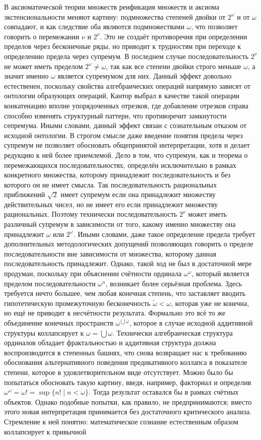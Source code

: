 \documentclass[12pt]{article}
\begin{document}
В аксиоматической теории множеств реификация множеств и аксиома экстенсиональности меняют картину: подмножества степеней двойки от $2^\omega$ и от $\omega$ совпадают, и как следствие оба являются подмножествами $\omega$, что позволяет говорить о перемежании $\nu$ и $2^{\nu}$. Это не создаёт противоречия при определении пределов через бесконечные ряды, но приводит к трудностям при переходе к определению предела через супремум. В последнем случае последовательность $2^\nu$ не может иметь пределом $2^\omega \neq \omega$, так как все степени двойки строго меньше $\omega$, а значит именно $\omega$ является супремумом для них. Данный эффект довольно естественен, поскольку свойства алгебраических операций напрямую зависят от онтологии образующих операций, Кантор выбрал в качестве такой операции конкатенацию вполне упорядоченных отрезков, где добавление отрезков справа способно изменять структурный паттерн, что противоречит замкнутости сепремума. Иными словами, данный эффект связан с сознательным отказом от исходной онтологии. В строгом смысле даже введение понятия предела через супремум не позволяет обосновать общепринятой интерпретации, хотя и делает редукцию к ней более приемлемой. Дело в том, что супремум, как и теорема о перемежающихся последовательностях, определён исключительно в рамках конкретного множества, которому принадлежит последовательность и без которого он не имеет смысла. Так последовательность рациональных приближений $\sqrt{2}$ имеет супремум если она принадлежит множеству действительных чисел, но не имеет его если принадлежит множеству рациональных. Поэтому технически последовательность $2^{\nu}$ может иметь различный супремум в зависимости от того, какому именно множеству она принадлежит $\omega$ или $2^{\omega}$. Иными словами, даже такое определение предела требует дополнительных методологических допущений позволяющих говорить о пределе последовательности вне зависимости от множества, которому данная последовательность принадлежит. Однако, такой ход не был в достаточной мере продуман, поскольку при объяснении счётности ординала $\omega^\omega$, который является пределом последовательности $\omega^n$, возникает более серьёзная проблема. Здесь требуется нечто большее, чем любая конечная степень, что заставляет вводить гипотетическую промежуточную бесконечность $\tilde{\omega} < \omega$, которая уже не конечна, но ещё не приводит к несчётности результата. Формально это всё то же объединение конечных пространств  $\omega^{\bigcup \omega}$, которое в случае исходной аддитивной структуры коллапсирует к $\omega = \bigcup \omega$. Технически алгебраическая структура ординалов обладает фрактальностью и аддитивная структура должна воспроизводится в степенных башнях, что снова возвращает нас к требованию обоснования альтернативного поведения предикативного коллапса в показателе степени, которое в удовлетворительном виде отсутствует. Можно было бы попытаться обосновать такую картину, введя, например, факториал и определив $\omega^\omega = \omega! = \sup \{ n! \mid n < \omega \}$. Тогда результат оставался бы в рамках счётных объектов. Однако подобные попытки, как правило, не предпринимаются; вместо этого новая интерпретация принимается без достаточного критического анализа. Стремление к ней понятно: математическое сознание естественным образом коллапсирует к привычной 
\end{document}
